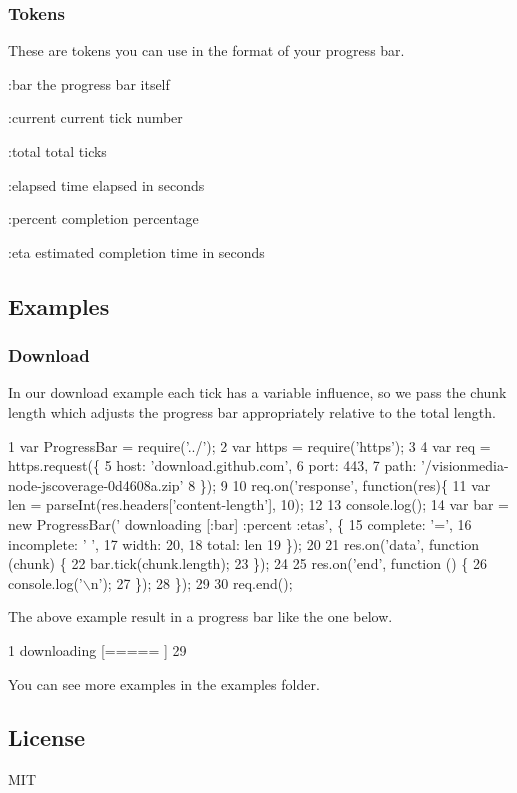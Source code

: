 \subsubsection*{Tokens}

These are tokens you can use in the format of your progress bar.


\begin{DoxyItemize}
\item {\ttfamily \+:bar} the progress bar itself
\item {\ttfamily \+:current} current tick number
\item {\ttfamily \+:total} total ticks
\item {\ttfamily \+:elapsed} time elapsed in seconds
\item {\ttfamily \+:percent} completion percentage
\item {\ttfamily \+:eta} estimated completion time in seconds
\end{DoxyItemize}

\subsection*{Examples}

\subsubsection*{Download}

In our download example each tick has a variable influence, so we pass the chunk length which adjusts the progress bar appropriately relative to the total length.


\begin{DoxyCode}
1 var ProgressBar = require('../');
2 var https = require('https');
3 
4 var req = https.request(\{
5   host: 'download.github.com',
6   port: 443,
7   path: '/visionmedia-node-jscoverage-0d4608a.zip'
8 \});
9 
10 req.on('response', function(res)\{
11   var len = parseInt(res.headers['content-length'], 10);
12 
13   console.log();
14   var bar = new ProgressBar('  downloading [:bar] :percent :etas', \{
15     complete: '=',
16     incomplete: ' ',
17     width: 20,
18     total: len
19   \});
20 
21   res.on('data', function (chunk) \{
22     bar.tick(chunk.length);
23   \});
24 
25   res.on('end', function () \{
26     console.log('\(\backslash\)n');
27   \});
28 \});
29 
30 req.end();
\end{DoxyCode}


The above example result in a progress bar like the one below.


\begin{DoxyCode}
1 downloading [=====             ] 29%
\end{DoxyCode}


You can see more examples in the {\ttfamily examples} folder.

\subsection*{License}

M\+I\+T 